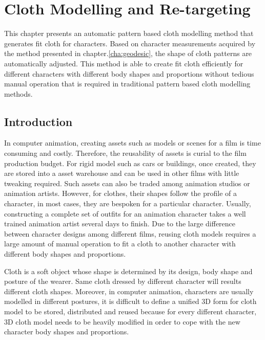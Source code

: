 
\ifx\isEmbedded\undefined

\graphicspath{{../images/}}

\fi




\chapter{Cloth Modelling and Re-targeting }
\label{cha:cloth_retargeting}

This chapter presents an automatic pattern based cloth modelling method that generates fit cloth for characters. Based on character measurements acquired by the method presented in chapter.\ref{cha:geodesic}, the shape of cloth patterns are automatically adjusted. This method is able to create fit cloth efficiently for different characters with different body shapes and proportions without tedious manual operation that is required in traditional pattern based cloth modelling methods. 


\section{Introduction}

In computer animation, creating assets such as models or scenes for a film is time consuming and costly. Therefore, the reusability of assets is curial to the film production budget. For rigid model such as cars or buildings, once created, they are stored into a asset warehouse and can be used in other films with little tweaking required. Such assets can also be traded among animation studios or animation artists. However, for clothes, their shapes follow the profile of a character, in most cases, they are bespoken for a particular character. Usually, constructing a complete set of outfits for an animation character takes a well trained animation artist several days to finish. Due to the large difference between character designs among different films, reusing cloth models requires a large amount of manual operation to fit a cloth to another character with different body shapes and proportions.

Cloth is a soft object whose shape is determined by its design, body shape and posture of the wearer. Same cloth dressed by different character will results different cloth shapes. Moreover, in computer animation, characters are usually modelled in different postures, it is difficult to define a unified 3D form for cloth model to be stored, distributed and reused because for every different character, 3D cloth model needs to be heavily modified in order to cope with the new  character body shapes and proportions. 

